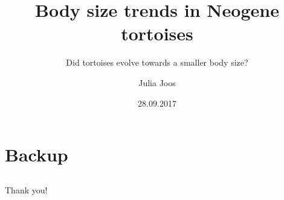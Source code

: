 \documentclass{beamer} %
\title{Body size trends in Neogene tortoises}
\subtitle{\small Did tortoises evolve towards a smaller body size?}
\author{Julia Joos}
\institute[OS]{Humboldt-Universität zu Berlin}
\date{28.09.2017}
\begin{document}

\begin{frame}[plain]
	\setcounter{framenumber}{0}
	\titlepage
\end{frame}






%






\appendix
\section[]{Backup}
\subsection[]{}



\begin{frame}
\begin{center}
	Thank you!
\end{center}

\end{frame}
\end{document}
